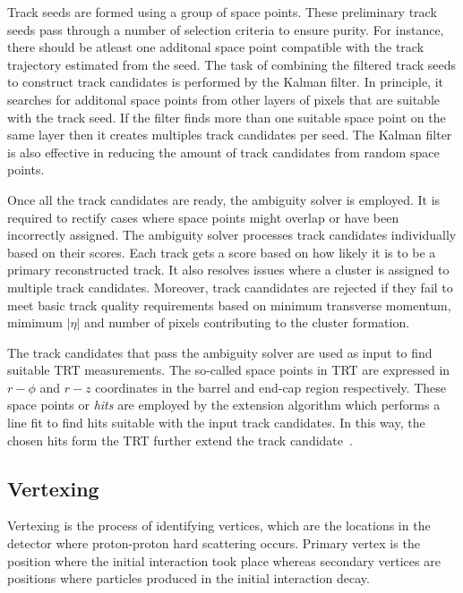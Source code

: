 Track seeds are formed using a group of space points. These preliminary track seeds pass through a number of selection criteria to ensure purity. For instance, there should be atleast one 
additonal space point compatible with the track trajectory estimated from the seed. The task of combining the filtered track seeds to construct track candidates is performed by 
the Kalman filter. In principle, it searches for additonal space points from other layers of pixels that are suitable with the track seed. If the filter finds more than one suitable space 
point on the same layer then it creates multiples track candidates per seed. The Kalman filter is also effective in reducing the amount of track candidates from random space points. 

Once all the track candidates are ready, the ambiguity solver is employed. It is required to rectify cases where space points might overlap or have been incorrectly assigned. 
The ambiguity solver processes track candidates individually based on their scores. Each track gets a score based on how likely it is to be a primary reconstructed track. 
It also resolves issues where a cluster is assigned to multiple track candidates. Moreover, track caandidates are rejected if they fail to meet basic track quality requirements based on
minimum transverse momentum, mimimum $|\eta|$ and number of pixels contributing to the cluster formation.

The track candidates that pass the ambiguity solver are used as input to find suitable TRT measurements. The so-called space points in TRT are expressed in $r-\phi$
and $r-z$ coordinates in the barrel and end-cap region respectively. These space points or \textit{hits} are employed by the extension algorithm which performs
a line fit to find hits suitable with the input track candidates. In this way, the chosen hits form the TRT further extend the track candidate~\cite{T_Cornelissen_2008}.

\subsection{Vertexing}
Vertexing is the process of identifying vertices, which are the locations in the detector where proton-proton hard scattering occurs.
Primary vertex is the position where the initial interaction took place whereas secondary vertices
are positions where particles produced in the initial interaction decay.

